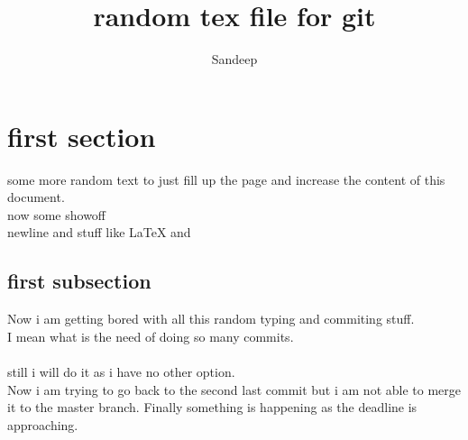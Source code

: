 \documentclass {article}
\author {Sandeep}
\title {random tex file for git}
\begin{document}
\maketitle
\section{first section}
some more random text to just fill up the page and increase the content of this document.\\
now some showoff\cite{sandu} \\
newline and stuff like \LaTeX{} and \cite{sandbook}

\subsection{first subsection}
Now i am getting bored with all this random typing and commiting stuff.\\
I mean what is the need of doing so many commits.\\ \\
still i will do it as i have no other option.
\\
Now i am trying to go back to the second last commit but i am not able to merge it to the master branch. Finally something is happening as the deadline is approaching.


\end{document}
